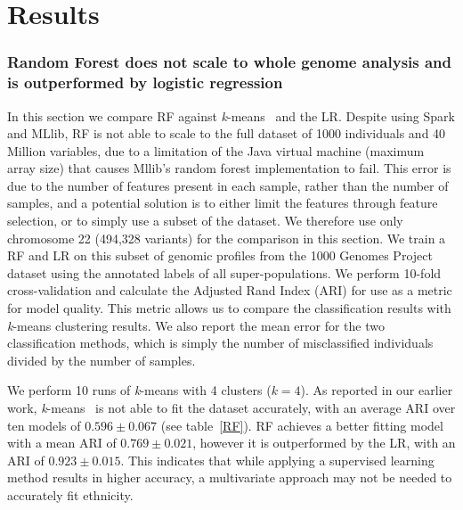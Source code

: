 \documentclass{llncs}
\newcommand{\kMeans}{\textit{k}-means }
\begin{document}
{%

\section{Results}

\subsubsection{Random Forest does not scale to whole genome analysis and is outperformed by logistic regression}
In this section we compare RF against \kMeans\ and the LR.  
Despite using {\sc Spark} and {\sc MLlib}, RF is not able to scale to the full dataset of 1000 individuals and 40
Million variables, due to a limitation of the Java virtual machine (maximum array size) that causes {\sc Mllib}'s
random forest implementation to fail. This error is due to the number of features present in each sample,
rather than the number of samples, and a potential solution is to either limit the features through feature selection, or to simply use a subset of the dataset.
We therefore use only chromosome 22 (494,328 variants) for the comparison in this section.  We train a RF
and LR on this subset of genomic profiles from the 1000 Genomes Project dataset using the annotated labels of all
super-populations.  We perform 10-fold cross-validation and calculate the Adjusted Rand Index (ARI) for use as a metric for model quality.
This metric allows us to compare the classification results with \kMeans{} clustering results.
We also report the mean error for the two classification methods, which is simply the number of misclassified individuals divided by the number of samples.


We perform 10 runs of \kMeans{} with 4 clusters (\(k=4\)). As reported in our earlier work, \kMeans\ is not able to fit the dataset accurately,
with an average ARI over ten models of \(0.596 \pm 0.067\) (see table~\ref{RF}).
RF achieves a better fitting model with a mean ARI of \(0.769 \pm 0.021\), however it is outperformed by the LR, with an ARI of \(0.923 \pm 0.015\).
This indicates that while applying a supervised learning method results in higher accuracy, a multivariate approach may not be needed to accurately fit ethnicity. 


}
\end{document}
